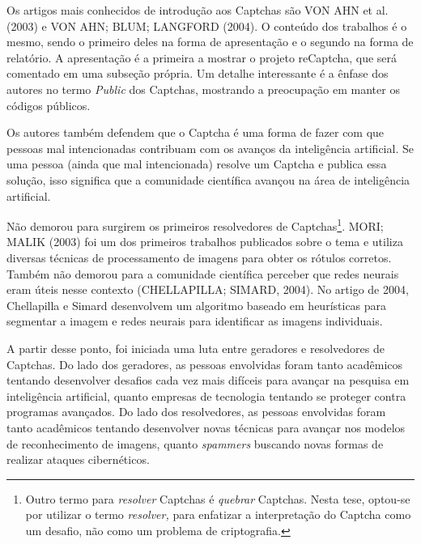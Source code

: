 \documentclass[12pt,twoside,brazilian]{book}
\begin{document}
Os artigos mais conhecidos de introdução aos Captchas são VON AHN et al.
(2003) e VON AHN; BLUM; LANGFORD (2004). O conteúdo dos trabalhos é o
mesmo, sendo o primeiro deles na forma de apresentação e o segundo na
forma de relatório. A apresentação é a primeira a mostrar o projeto
reCaptcha, que será comentado em uma subseção própria. Um detalhe
interessante é a ênfase dos autores no termo \emph{Public} dos Captchas,
mostrando a preocupação em manter os códigos públicos.

Os autores também defendem que o Captcha é uma forma de fazer com que
pessoas mal intencionadas contribuam com os avanços da inteligência
artificial. Se uma pessoa (ainda que mal intencionada) resolve um
Captcha e publica essa solução, isso significa que a comunidade
científica avançou na área de inteligência artificial.

Não demorou para surgirem os primeiros resolvedores de
Captchas\footnote{Outro termo para \emph{resolver} Captchas é
  \emph{quebrar} Captchas. Nesta tese, optou-se por utilizar o termo
  \emph{resolver,} para enfatizar a interpretação do Captcha como um
  desafio, não como um problema de criptografia.}. MORI; MALIK (2003)
foi um dos primeiros trabalhos publicados sobre o tema e utiliza
diversas técnicas de processamento de imagens para obter os rótulos
corretos. Também não demorou para a comunidade científica perceber que
redes neurais eram úteis nesse contexto (CHELLAPILLA; SIMARD, 2004). No
artigo de 2004, Chellapilla e Simard desenvolvem um algoritmo baseado em
heurísticas para segmentar a imagem e redes neurais para identificar as
imagens individuais.

A partir desse ponto, foi iniciada uma luta entre geradores e
resolvedores de Captchas. Do lado dos geradores, as pessoas envolvidas
foram tanto acadêmicos tentando desenvolver desafios cada vez mais
difíceis para avançar na pesquisa em inteligência artificial, quanto
empresas de tecnologia tentando se proteger contra programas avançados.
Do lado dos resolvedores, as pessoas envolvidas foram tanto acadêmicos
tentando desenvolver novas técnicas para avançar nos modelos de
reconhecimento de imagens, quanto \emph{spammers} buscando novas formas
de realizar ataques cibernéticos.
\end{document}
